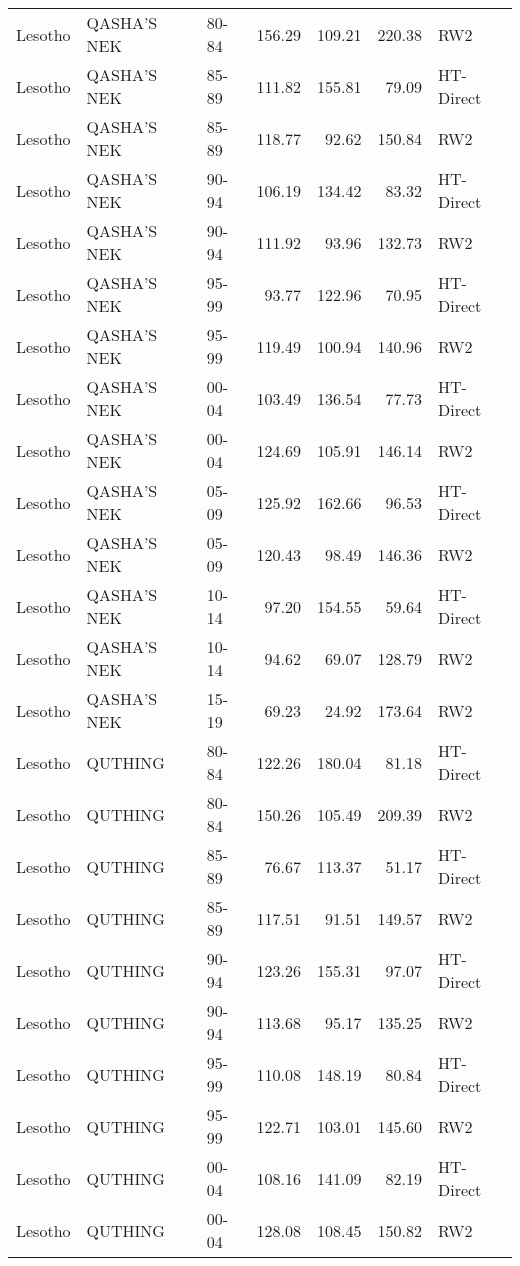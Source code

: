 \begin{longtable}{lllrrrl}
  Lesotho & QASHA'S NEK & 80-84 & 156.29 & 109.21 & 220.38 & RW2 \\ 
  Lesotho & QASHA'S NEK & 85-89 & 111.82 & 155.81 & 79.09 & HT-Direct \\ 
  Lesotho & QASHA'S NEK & 85-89 & 118.77 & 92.62 & 150.84 & RW2 \\ 
  Lesotho & QASHA'S NEK & 90-94 & 106.19 & 134.42 & 83.32 & HT-Direct \\ 
  Lesotho & QASHA'S NEK & 90-94 & 111.92 & 93.96 & 132.73 & RW2 \\ 
  Lesotho & QASHA'S NEK & 95-99 & 93.77 & 122.96 & 70.95 & HT-Direct \\ 
  Lesotho & QASHA'S NEK & 95-99 & 119.49 & 100.94 & 140.96 & RW2 \\ 
  Lesotho & QASHA'S NEK & 00-04 & 103.49 & 136.54 & 77.73 & HT-Direct \\ 
  Lesotho & QASHA'S NEK & 00-04 & 124.69 & 105.91 & 146.14 & RW2 \\ 
  Lesotho & QASHA'S NEK & 05-09 & 125.92 & 162.66 & 96.53 & HT-Direct \\ 
  Lesotho & QASHA'S NEK & 05-09 & 120.43 & 98.49 & 146.36 & RW2 \\ 
  Lesotho & QASHA'S NEK & 10-14 & 97.20 & 154.55 & 59.64 & HT-Direct \\ 
  Lesotho & QASHA'S NEK & 10-14 & 94.62 & 69.07 & 128.79 & RW2 \\ 
  Lesotho & QASHA'S NEK & 15-19 & 69.23 & 24.92 & 173.64 & RW2 \\ 
  Lesotho & QUTHING & 80-84 & 122.26 & 180.04 & 81.18 & HT-Direct \\ 
  Lesotho & QUTHING & 80-84 & 150.26 & 105.49 & 209.39 & RW2 \\ 
  Lesotho & QUTHING & 85-89 & 76.67 & 113.37 & 51.17 & HT-Direct \\ 
  Lesotho & QUTHING & 85-89 & 117.51 & 91.51 & 149.57 & RW2 \\ 
  Lesotho & QUTHING & 90-94 & 123.26 & 155.31 & 97.07 & HT-Direct \\ 
  Lesotho & QUTHING & 90-94 & 113.68 & 95.17 & 135.25 & RW2 \\ 
  Lesotho & QUTHING & 95-99 & 110.08 & 148.19 & 80.84 & HT-Direct \\ 
  Lesotho & QUTHING & 95-99 & 122.71 & 103.01 & 145.60 & RW2 \\ 
  Lesotho & QUTHING & 00-04 & 108.16 & 141.09 & 82.19 & HT-Direct \\ 
  Lesotho & QUTHING & 00-04 & 128.08 & 108.45 & 150.82 & RW2 \\ 

\end{longtable}
